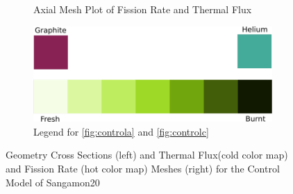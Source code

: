 \begin{figure}[H]
\begin{subfigure}{0.45\textwidth}
  \caption{Axial Mesh Plot of Fission Rate and Thermal Flux}
  \label{fig:controld}
\end{subfigure}
%
\begin{subfigure}{\textwidth}
\centering
\includegraphics[width=0.6\linewidth]{figures/geom-legend}
\caption{Legend for \ref{fig:controla} and \ref{fig:controlc}}
\label{fig:geom-legend1}
\end{subfigure}

\caption{Geometry Cross Sections (left) and Thermal Flux(cold color map) and Fission Rate (hot color map) Meshes (right) for the Control Model of Sangamon20}
\label{fig:controlmain}
\end{figure}